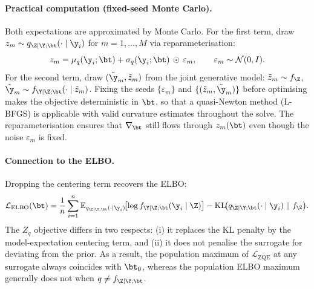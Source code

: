 \paragraph{Practical computation (fixed-seed Monte Carlo).}
Both expectations are approximated by Monte Carlo.
For the first term, draw $z_m \sim q_{\Z\mid\Y;\bt}(\cdot\mid\y_i)$ for $m=1,\dots,M$
via reparameterisation:
%
\[
  z_m = \mu_q(\y_i;\bt) + \sigma_q(\y_i;\bt)\,\odot\,\varepsilon_m,
  \qquad \varepsilon_m \sim \mathcal{N}(0,I).
\]
%
For the second term, draw $(\tilde\y_m, \tilde z_m)$ from the joint generative model:
$\tilde z_m \sim f_\Z$, $\tilde\y_m \sim f_{\Y\mid\Z;\bt}(\cdot\mid\tilde z_m)$.
Fixing the seeds $\{\varepsilon_m\}$ and $\{(\tilde z_m, \tilde\y_m)\}$ before
optimising makes the objective deterministic in $\bt$, so that a quasi-Newton method
(L-BFGS) is applicable with valid curvature estimates throughout the solve.
The reparameterisation ensures that $\nabla_\bt$ still flows through $z_m(\bt)$ even
though the noise $\varepsilon_m$ is fixed.

\paragraph{Connection to the ELBO.}
Dropping the centering term recovers the ELBO:
%
\[
  \mathcal{L}_{\mathrm{ELBO}}(\bt)
  =
  \frac{1}{n}\sum_{i=1}^n
  \mathbb{E}_{q_{\Z\mid\Y;\bt}(\cdot\mid\y_i)}
  \!\bigl[\log f_{\Y\mid\Z;\bt}(\y_i\mid\Z)\bigr]
  -
  \mathrm{KL}\!\bigl(q_{\Z\mid\Y;\bt}(\cdot\mid\y_i)\;\|\;f_\Z\bigr).
\]
%
The $Z_q$ objective differs in two respects: (i) it replaces the KL penalty by the
model-expectation centering term, and (ii) it does not penalise the surrogate for
deviating from the prior. As a result, the population maximum of
$\mathcal{L}_{\mathrm{ZQE}}$ at any surrogate always coincides with $\bt_0$, whereas
the population ELBO maximum generally does not when $q \neq f_{\Z\mid\Y;\bt}$.
